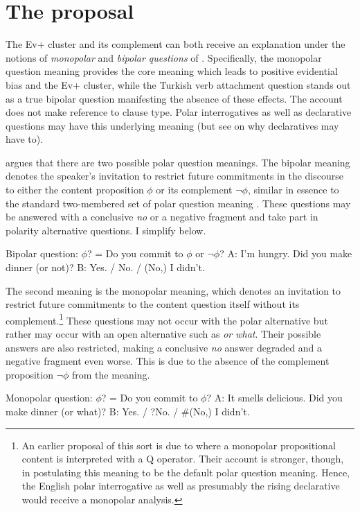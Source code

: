 \documentclass[output=paper,colorlinks,citecolor=brown]{langscibook}
\begin{document}
\section{The proposal}\label{sec:11:3}

The Ev+ cluster and its complement can both receive an explanation under the notions of \textit{monopolar} and \textit{bipolar questions} of \citet{krifka15}. Specifically, the monopolar question meaning provides the core meaning which leads to positive evidential bias and the Ev+ cluster, while the Turkish verb attachment question stands out as a true bipolar question manifesting the absence of these effects. The account does not make reference to clause type. Polar interrogatives as well as declarative questions may have this underlying meaning (but see  on why declaratives may have to).

\citet{krifka15} argues that there are two possible polar question meanings. The bipolar meaning denotes the speaker's invitation to restrict future commitments in the discourse to either the content proposition $\phi$ or its complement $\neg\phi$, similar in essence to the standard two-membered set of polar question meaning \citep{Hamblin:1973, Karttunen:1977}. These questions may be answered with a conclusive \textit{no} or a negative fragment and take part in polarity alternative questions. I simplify below.

\ea Bipolar question: $\phi$? = Do you commit to $\phi$ or $\neg\phi$?
\sn A: I'm hungry. Did you make dinner (or not)?
\sn B: Yes. / No. / (No,) I didn't.
\z

The second meaning is the monopolar meaning, which denotes an invitation to restrict future commitments to the content question itself without its complement.\footnote{An earlier proposal of this sort is due to \citet{biezma-rawlins12} where a monopolar propositional content is interpreted with a Q operator. Their account is stronger, though, in postulating this meaning to be the default polar question meaning. Hence, the English polar interrogative as well as presumably the rising declarative would receive a monopolar analysis.} These questions may not occur with the polar alternative but rather may occur with an open alternative such as \textit{or what}. Their possible answers are also restricted, making a conclusive \textit{no} answer degraded and a negative fragment even worse. This is due to the absence of the complement proposition $\neg\phi$ from the meaning. 

\ea Monopolar question: $\phi$? = Do you commit to $\phi$?
\sn A: It smells delicious. Did you make dinner (or what)? %
\sn B: Yes. / ?No. / \#(No,) I didn't.%
\z
\end{document}
